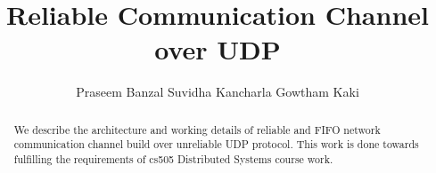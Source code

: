 \documentclass[preprint]{llncs}
\begin{document}
\title{Reliable Communication Channel over UDP}

\author{Praseem Banzal \hspace*{.25in} Suvidha Kancharla
\hspace*{.25in} Gowtham Kaki}

\maketitle

\begin{abstract}

We describe the architecture and working details of reliable and FIFO
network communication channel build over unreliable UDP protocol. This
work is done towards fulfilling the requirements of cs505 Distributed
Systems course work.
\end{abstract}









\end{document}
